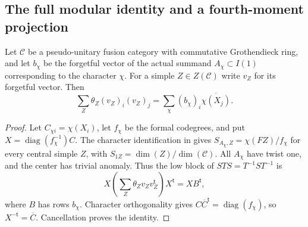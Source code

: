 \subsection{The full modular identity and a fourth-moment projection}

\begin{lemma}\label{lem:full-induction-sts}
Let $\mathcal C$ be a pseudo-unitary fusion category with commutative
Grothendieck ring, and let $b_\chi$ be the forgetful vector of the
actual summand $A_\chi\subset I(1)$ corresponding to the character
$\chi$. For a simple $Z\in Z(\mathcal C)$ write $v_Z$ for its
forgetful vector. Then
\begin{equation}\label{eq:full-induction-sts}
 \sum_Z\theta_Z(v_Z)_i(v_Z)_j
 =\sum_\chi(b_\chi)_i\overline{\chi(X_j)}.
\end{equation}
\end{lemma}
\begin{proof}
Let $C_{\chi i}=\chi(X_i)$, let $f_\chi$ be the formal codegrees,
and put $X=\operatorname{diag}(f_\chi^{-1})C$.
The character identification in \cite[Example~2.9 and
Theorem~2.13]{OstrikPiv3} gives
$S_{A_\chi,Z}=\chi(FZ)/f_\chi$ for every central simple $Z$,
with $S_{1Z}=\dim(Z)/\dim(\mathcal C)$.
All $A_\chi$ have twist one, and the center has trivial anomaly.
Thus the low block of $STS=T^{-1}ST^{-1}$ is
\[
 X\left(\sum_Z\theta_Zv_Zv_Z^{\mathsf t}\right)X^{\mathsf t}
 =XB^{\mathsf t},
\]
where $B$ has rows $b_\chi$. Character orthogonality gives
$C\overline C^{\mathsf t}=\operatorname{diag}(f_\chi)$,
so $X^{-\mathsf t}=\overline C$. Cancellation proves the identity.
\end{proof}

